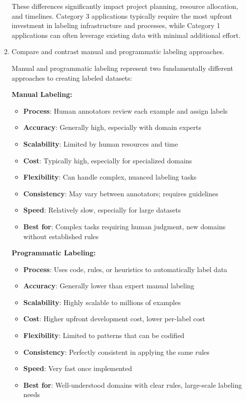 \documentclass[12pt]{article}
\begin{document}
\begin{enumerate}
\begin{tcolorbox}[colback=blue!5!white,colframe=blue!75!black,title={Solution}]
    These differences significantly impact project planning, resource allocation, and timelines. Category 3 applications typically require the most upfront investment in labeling infrastructure and processes, while Category 1 applications can often leverage existing data with minimal additional effort.
    \end{tcolorbox}
    
    \item Compare and contrast manual and programmatic labeling approaches.
    
    \begin{tcolorbox}[colback=blue!5!white,colframe=blue!75!black,title={Solution}]
    Manual and programmatic labeling represent two fundamentally different approaches to creating labeled datasets:
    
    \textbf{Manual Labeling:}
    \begin{itemize}
        \item \textbf{Process}: Human annotators review each example and assign labels
        \item \textbf{Accuracy}: Generally high, especially with domain experts
        \item \textbf{Scalability}: Limited by human resources and time
        \item \textbf{Cost}: Typically high, especially for specialized domains
        \item \textbf{Flexibility}: Can handle complex, nuanced labeling tasks
        \item \textbf{Consistency}: May vary between annotators; requires guidelines
        \item \textbf{Speed}: Relatively slow, especially for large datasets
        \item \textbf{Best for}: Complex tasks requiring human judgment, new domains without established rules
    \end{itemize}
    
    \textbf{Programmatic Labeling:}
    \begin{itemize}
        \item \textbf{Process}: Uses code, rules, or heuristics to automatically label data
        \item \textbf{Accuracy}: Generally lower than expert manual labeling
        \item \textbf{Scalability}: Highly scalable to millions of examples
        \item \textbf{Cost}: Higher upfront development cost, lower per-label cost
        \item \textbf{Flexibility}: Limited to patterns that can be codified
        \item \textbf{Consistency}: Perfectly consistent in applying the same rules
        \item \textbf{Speed}: Very fast once implemented
        \item \textbf{Best for}: Well-understood domains with clear rules, large-scale labeling needs
    \end{itemize}
    

\end{tcolorbox}
\end{enumerate}
\end{document}
